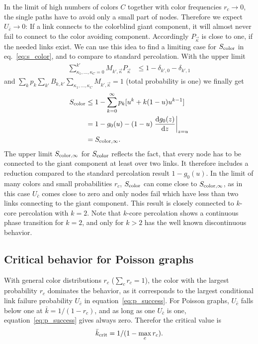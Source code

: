 \documentclass[aps, pre, onecolumn, a4paper, floatfix]{revtex4}
\begin{document}
In the limit of high numbers of colors $C$ together with color frequencies $r_c \to 0$, the 
single paths have to avoid only a small part of nodes. Therefore we expect $U_{\bar c}\to 0$: If a 
link connects to the colorblind giant component, it will almost never fail to connect to 
the color avoiding component. Accordingly $P_{\vec \kappa}$ is close to one, if the needed 
links exist. We can use this idea to find a limiting case for $S_{\rm color}$ in eq.~\ref{eq:s_color}, 
and to compare to standard percolation. With the upper limit 
\begin{align}
\sum_{\kappa_1,\dots, \kappa_C=0}^{k'} M_{k',\vec \kappa} 
P_{\vec \kappa} &\leq 1-\delta_{k',0}-\delta_{k',1}
\end{align}
and $\sum_{k}p_k \sum_{k'} B_{k,k'} \sum_{\kappa_1,\dots, \kappa_C} M_{k',\vec \kappa} = 1$ 
(total probability is one) we finally get 
%
\begin{align}
S_{\rm color} &\leq 1-\sum_{k=0}^{\infty}p_k [u^k +k (1-u) u^{k-1}]\\
 &= 1 - g_0(u) - (1-u) \left.\frac{{\rm d}g_0(z)}{{\rm d}z}\right|_{z=u}\\
 &= S_{{\rm color},\infty}.\label{eq:limit}
\end{align}
%
The upper limit $S_{{\rm color},\infty}$ for $S_{\rm color}$ reflects the fact, that every node has to be 
connected to the giant component at least over two links. It therefore includes a reduction 
compared to the standard percolation result $1-g_0(u)$. In the limit of many colors and small 
probabilities $r_c$, $S_{\rm color}$ can come close to $S_{{\rm color},\infty}$, as in this case $U_{\bar c}$ comes 
close to zero and only nodes fail which have less than two links connecting to the giant component. 
This result is closely connected to $k$-core percolation with $k=2$. Note that $k$-core percolation shows 
a continuous phase transition for $k=2$, and only for $k>2$ has the well known discontinuous behavior. 


\subsection{Critical behavior for Poisson graphs}

With general color distributions $r_c$ ($\sum_c r_c =1$), the color with the largest probability 
$r_c$ dominates 
the behavior, as it corresponds to the largest conditional link failure probability $U_{\bar c}$
in equation~\ref{eq:p_success}. For Poisson graphs, $U_{\bar c}$ 
falls below one at ${\bar k}=1/(1-r_c)$, and as long as one $U_{\bar c}$ is one, equation~\ref{eq:p_success}
gives always zero. Therefor the critical value is 
\begin{align}
{\bar k}_{\rm crit}=1/(1-\max_c r_c).
\end{align}
\end{document}
